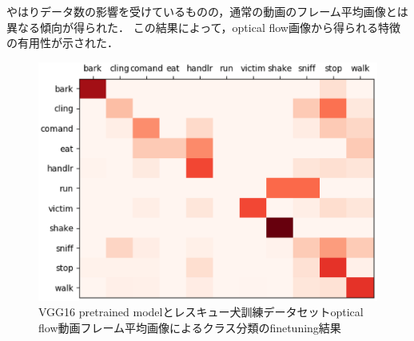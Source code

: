 やはりデータ数の影響を受けているものの，通常の動画のフレーム平均画像とは異なる傾向が得られた．
この結果によって，optical flow画像から得られる特徴の有用性が示された．
\begin{figure}[H]
  \begin{center}
    \includegraphics[scale=0.7]{./Figures/resque_optmean_result.eps}
    \caption{VGG16 pretrained modelとレスキュー犬訓練データセットoptical flow動画フレーム平均画像によるクラス分類のfinetuning結果}
    \label{sub_optresque_res}
  \end{center}
\end{figure}
